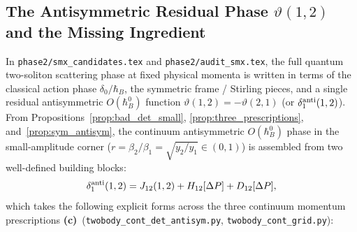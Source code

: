 \documentclass[11pt,a4paper]{article}
\newcommand{\Lc}{\textbf{(c)}}
\newcommand{\script}[1]{\texttt{#1}}
\begin{document}
\subsection{The Antisymmetric Residual Phase $\vartheta(1,2)$ and the Missing Ingredient}

In \texttt{phase2/smx\_candidates.tex} and \texttt{phase2/audit\_smx.tex}, the full quantum two-soliton scattering phase at fixed physical momenta is written in terms of the classical action phase $\delta_0/\hbar_B$, the symmetric frame / Stirling pieces, and a single residual antisymmetric $O(\hbar_B^0)$ function $\vartheta(1,2)=-\vartheta(2,1)$ (or $\delta_1^{\rm anti}(1,2)$). From Propositions~\ref{prop:bad_det_small}, \ref{prop:three_prescriptions}, and~\ref{prop:sym_antisym}, the continuum antisymmetric $O(\hbar_B^0)$ phase in the small-amplitude corner ($r=\beta_2/\beta_1=\sqrt{y_2/y_1}\in(0,1)$) is assembled from two well-defined building blocks:
\begin{equation}\label{eq:delta1_anti_decomp}
\delta_1^{\rm anti}(1,2)=J_{12}(1,2)+H_{12}[\Delta P]+D_{12}[\Delta P],
\end{equation}
which takes the following explicit forms across the three continuum momentum prescriptions \Lc\ (\script{twobody\_cont\_det\_antisym.py}, \script{twobody\_cont\_grid.py}):
\end{document}
